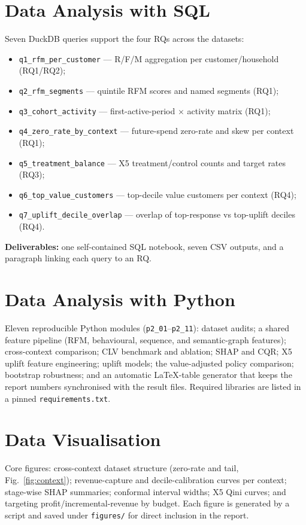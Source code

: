 \documentclass[pdflatex,sn-mathphys-num]{sn-jnl}
\begin{document}
\section{Data Analysis with SQL}\label{sec:sql}
Seven DuckDB queries support the four RQs across the datasets:
\begin{itemize}
\item \texttt{q1\_rfm\_per\_customer} --- R/F/M aggregation per customer/household (RQ1/RQ2);
\item \texttt{q2\_rfm\_segments} --- quintile RFM scores and named segments (RQ1);
\item \texttt{q3\_cohort\_activity} --- first-active-period $\times$ activity matrix (RQ1);
\item \texttt{q4\_zero\_rate\_by\_context} --- future-spend zero-rate and skew per context (RQ1);
\item \texttt{q5\_treatment\_balance} --- X5 treatment/control counts and target rates (RQ3);
\item \texttt{q6\_top\_value\_customers} --- top-decile value customers per context (RQ4);
\item \texttt{q7\_uplift\_decile\_overlap} --- overlap of top-response vs top-uplift deciles (RQ4).
\end{itemize}
\noindent\textbf{Deliverables:} one self-contained SQL notebook, seven CSV outputs, and a paragraph
linking each query to an RQ.

\section{Data Analysis with Python}\label{sec:py}
Eleven reproducible Python modules (\texttt{p2\_01}--\texttt{p2\_11}):
dataset audits; a shared feature pipeline (RFM, behavioural, sequence, and semantic-graph features);
cross-context comparison; CLV benchmark and ablation; SHAP and CQR; X5 uplift feature engineering;
uplift models; the value-adjusted policy comparison; bootstrap robustness; and an automatic
LaTeX-table generator that keeps the report numbers synchronised with the result files. Required
libraries are listed in a pinned \texttt{requirements.txt}.

\section{Data Visualisation}\label{sec:viz}
Core figures: cross-context dataset structure (zero-rate and tail, Fig.~\ref{fig:context});
revenue-capture and decile-calibration curves per context; stage-wise SHAP summaries; conformal
interval widths; X5 Qini curves; and targeting profit/incremental-revenue by budget. Each figure is
generated by a script and saved under \texttt{figures/} for direct inclusion in the report.
\end{document}
